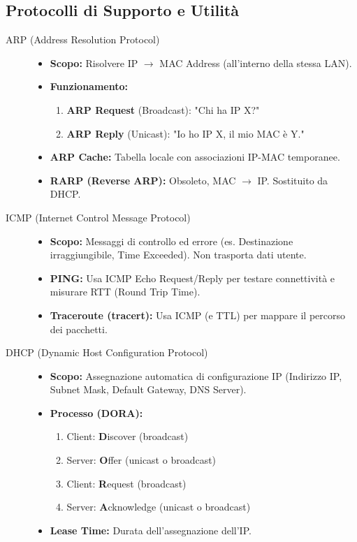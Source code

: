 \subsection{Protocolli di Supporto e Utilità}
\begin{description}
    \item[ARP (Address Resolution Protocol)]
        \begin{itemize}
            \item \textbf{Scopo:} Risolvere IP $\rightarrow$ MAC Address (all'interno della stessa LAN).
            \item \textbf{Funzionamento:}
                \begin{enumerate}
                    \item \textbf{ARP Request} (Broadcast): "Chi ha IP X?"
                    \item \textbf{ARP Reply} (Unicast): "Io ho IP X, il mio MAC è Y."
                \end{enumerate}
            \item \textbf{ARP Cache:} Tabella locale con associazioni IP-MAC temporanee.
            \item \textbf{RARP (Reverse ARP):} Obsoleto, MAC $\rightarrow$ IP. Sostituito da DHCP.
        \end{itemize}
    \item[ICMP (Internet Control Message Protocol)]
        \begin{itemize}
            \item \textbf{Scopo:} Messaggi di controllo ed errore (es. Destinazione irraggiungibile, Time Exceeded). Non trasporta dati utente.
            \item \textbf{PING:} Usa ICMP Echo Request/Reply per testare connettività e misurare RTT (Round Trip Time).
            \item \textbf{Traceroute (tracert):} Usa ICMP (e TTL) per mappare il percorso dei pacchetti.
        \end{itemize}
    \item[DHCP (Dynamic Host Configuration Protocol)]
        \begin{itemize}
            \item \textbf{Scopo:} Assegnazione automatica di configurazione IP (Indirizzo IP, Subnet Mask, Default Gateway, DNS Server).
            \item \textbf{Processo (DORA):}
                \begin{enumerate}
                    \item Client: \textbf{D}iscover (broadcast)
                    \item Server: \textbf{O}ffer (unicast o broadcast)
                    \item Client: \textbf{R}equest (broadcast)
                    \item Server: \textbf{A}cknowledge (unicast o broadcast)
                \end{enumerate}
            \item \textbf{Lease Time:} Durata dell'assegnazione dell'IP.
        \end{itemize}
\end{description}

